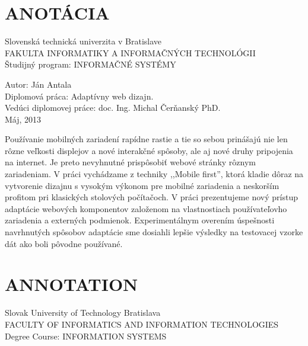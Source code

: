 
\newpage


%



\section*{ANOTÁCIA}
\thispagestyle{empty}
Slovenská technická univerzita v Bratislave\\
FAKULTA INFORMATIKY A INFORMAČNÝCH TECHNOLÓGII\\
Študijný program: INFORMAČNÉ SYSTÉMY
\newline

Autor: Ján Antala\\
Diplomová práca: Adaptívny web dizajn.\\ 
Vedúci diplomovej práce: doc. Ing. Michal Čerňanský PhD. \\
Máj, 2013
\newline

Používanie mobilných zariadení rapídne rastie a tie so sebou prinášajú nie len rôzne veľkosti displejov a nové interakčné spôsoby, ale aj nové druhy pripojenia na internet. Je preto nevyhnutné prispôsobiť webové stránky rôznym zariadeniam.
V práci vychádzame z techniky ,,Mobile first'', ktorá kladie dôraz na vytvorenie dizajnu s vysokým výkonom pre mobilné zariadenia a neskorším profitom pri klasických stolových počítačoch. V práci prezentujeme nový prístup adaptácie webových komponentov založenom na vlastnostiach používateľovho zariadenia a externých podmienok.
Experimentálnym overením úspešnosti navrhnutých spôsobov adaptácie sme dosiahli lepšie výsledky na testovacej vzorke dát ako boli pôvodne používané.

\newpage

\section*{ANNOTATION}
\thispagestyle{empty}
Slovak University of Technology Bratislava\\
FACULTY OF INFORMATICS AND INFORMATION TECHNOLOGIES\\
Degree Course: INFORMATION SYSTEMS
\newline

